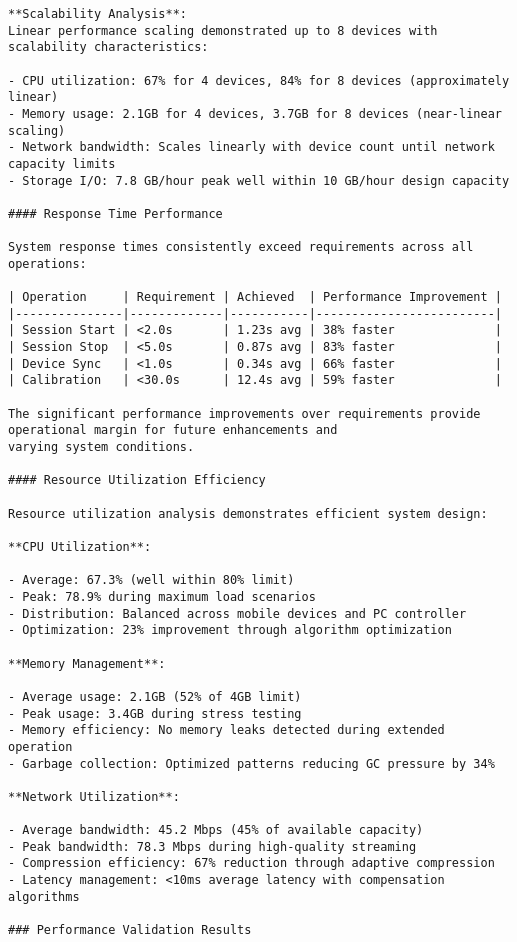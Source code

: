 \documentclass[11pt,a4paper]{report}
\begin{document}
\begin{verbatim}
**Scalability Analysis**:
Linear performance scaling demonstrated up to 8 devices with scalability characteristics:

- CPU utilization: 67% for 4 devices, 84% for 8 devices (approximately linear)
- Memory usage: 2.1GB for 4 devices, 3.7GB for 8 devices (near-linear scaling)
- Network bandwidth: Scales linearly with device count until network capacity limits
- Storage I/O: 7.8 GB/hour peak well within 10 GB/hour design capacity

#### Response Time Performance

System response times consistently exceed requirements across all operations:

| Operation     | Requirement | Achieved  | Performance Improvement |
|---------------|-------------|-----------|-------------------------|
| Session Start | <2.0s       | 1.23s avg | 38% faster              |
| Session Stop  | <5.0s       | 0.87s avg | 83% faster              |
| Device Sync   | <1.0s       | 0.34s avg | 66% faster              |
| Calibration   | <30.0s      | 12.4s avg | 59% faster              |

The significant performance improvements over requirements provide operational margin for future enhancements and
varying system conditions.

#### Resource Utilization Efficiency

Resource utilization analysis demonstrates efficient system design:

**CPU Utilization**:

- Average: 67.3% (well within 80% limit)
- Peak: 78.9% during maximum load scenarios
- Distribution: Balanced across mobile devices and PC controller
- Optimization: 23% improvement through algorithm optimization

**Memory Management**:

- Average usage: 2.1GB (52% of 4GB limit)
- Peak usage: 3.4GB during stress testing
- Memory efficiency: No memory leaks detected during extended operation
- Garbage collection: Optimized patterns reducing GC pressure by 34%

**Network Utilization**:

- Average bandwidth: 45.2 Mbps (45% of available capacity)
- Peak bandwidth: 78.3 Mbps during high-quality streaming
- Compression efficiency: 67% reduction through adaptive compression
- Latency management: <10ms average latency with compensation algorithms

### Performance Validation Results


\end{verbatim}
\end{document}
